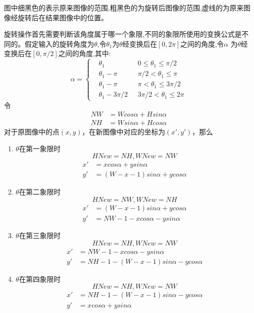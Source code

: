 \documentclass{XDBAthesis}
\begin{document}
图中细黑色的表示原来图像的范围,粗黑色的为旋转后图像的范围,虚线的为原来图像经旋转后在结果图像中的位置。

旋转操作首先需要判断该角度属于哪一个象限,不同的象限所使用的变换公式是不同的。假定输入的旋转角度为$\theta $,令$\theta_1 $为$\theta$经变换后在$[0,2\pi ]$之间的角度,令$\alpha $ 为$\theta $经变换后在$[0,\pi /2 ]$之间的角度,其中:
$$
\alpha =\left\{ 
    \begin{aligned}
       & \theta_1 &0 \leq \theta_1 \leq \pi /2 \\
       & \theta_1 -\pi &\pi /2 < \theta_1 \leq \pi\\
       & \theta_1 -\pi &\pi < \theta_1 \leq 3\pi /2\\
       & \theta_1 -3\pi /2 \ \ \ &3\pi /2 <\theta_1 \leq 2\pi 
    \end{aligned}
\right.
$$
令
$$
\begin{aligned}
NW&=Wcos\alpha +Hsin\alpha \\
NH&=Wsin\alpha +Hcos\alpha 
\end{aligned}
$$
对于原图像中的点$(x,y)$，在新图像中对应的坐标为$(x',y')$，那么
\begin{enumerate}
    \item $\theta $在第一象限时$$HNew=NH,WNew=NW$$
    $$
    \begin{aligned}
      x'&=xcos\alpha +ysin\alpha\\
      y'&=(W-x-1)sin\alpha +ycos\alpha
    \end{aligned}
    $$
    \item $\theta $在第二象限时$$HNew=NW,WNew=NH$$
    $$
    \begin{aligned}
      x'&=(W-x-1)sin\alpha +ycos\alpha\\
      y'&=NW-1-xcos\alpha -ysin\alpha
    \end{aligned}
    $$
    \item $\theta $在第三象限时$$HNew=NH,WNew=NW$$
     $$
    \begin{aligned}
      x'&=NW-1-xcos\alpha -ysin\alpha\\
      y'&=NH-1-(W-x-1)sin\alpha -ycos\alpha
    \end{aligned}
    $$
    \item $\theta $在第四象限时$$HNew=NH,WNew=NW$$
     $$
    \begin{aligned}
      x'&=NH-1-(W-x-1)sin\alpha -ycos\alpha\\
      y'&=xcos\alpha +ysin\alpha
    \end{aligned}
    $$
\end{enumerate}
\end{document}

